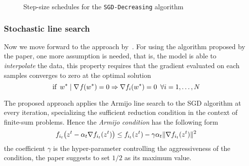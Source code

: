 \begin{figure}
\centering
{} \quad
{}
\caption{Step-size schedules for the \texttt{SGD-Decreasing} algorithm}
\label{fig:decre-step}
\end{figure}

\subsubsection{Stochastic line search}

Now we move forward to the approach by~\textcite{vaswani_painless_2019}. For using the algorithm proposed by the paper, one more assumption is needed, that is, the model is able to \emph{interpolate} the data, this property requires that the gradient evaluated on each samples converges to zero at the optimal solution
\[
\text{if}\,\,\,w^\ast\mid\nabla\operatorname*{\mathit{f}}(w^\ast)=0\Rightarrow\nabla f_i(w^\ast)=0\,\,\,\forall i=1,\dots,N
\]

The proposed approach applies the Armijo line search to the SGD algorithm at every iteration, specializing the sufficient reduction condition in the context of finite-sum problems. Hence the \emph{Armijo condition} has the following form
\begin{equation}\label{eq:mini-armijo}
f_{i_t}\bigl(z^t-\alpha_t\nabla f_{i_t}(z^t)\bigr)\leq f_{i_t}(z^t)-\gamma\alpha_t\lVert\nabla f_{i_t}(z^t)\rVert^2
\end{equation}
the coefficient $\gamma$ is the hyper-parameter controlling the aggressiveness of the condition, the paper suggests to set $1/2$ as its maximum value.

